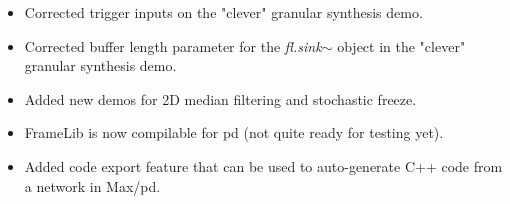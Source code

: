 \documentclass{article}
\newcommand{\flobject}[1]{\textit{fl.#1$\sim$}}
\begin{document}
\begin{itemize}
\item Corrected trigger inputs on the "clever" granular synthesis demo.
\item Corrected buffer length parameter for the  \flobject{sink} object in the "clever" granular synthesis demo.
\item Added new demos for 2D median filtering and stochastic freeze.
\item FrameLib is now compilable for pd (not quite ready for testing yet).
\item Added code export feature that can be used to auto-generate C++ code from a network in Max/pd.
\end{itemize}
\end{document}
